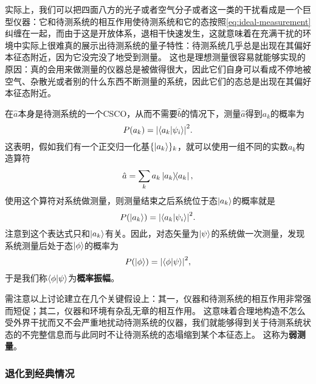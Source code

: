 \documentclass[hyperref, UTF8, a4paper]{ctexart}
\begin{document}

实际上，我们可以把四面八方的光子或者空气分子或者这一类的干扰看成是一个巨型仪器：它和待测系统的相互作用使待测系统和它的态按照\eqref{eq:ideal-measurement}纠缠在一起，而由于这是开放体系，退相干快速发生，这就意味着在充满干扰的环境中实际上很难真的展示出待测系统的量子特性：待测系统几乎总是出现在其偏好本征态附近，因为它没完没了地受到测量。
这也是理想测量很容易就能够实现的原因：真的会用来做测量的仪器总是被做得很大，因此它们自身可以看成不停地被空气、杂散光或者别的什么东西不断测量的系统，因此它们的态总是出现在其偏好本征态附近。

在$\hat{a}$本身是待测系统的一个CSCO，从而不需要$\hat{b}$的情况下，测量$\hat{a}$得到$a_k$的概率为
\begin{equation}
    P(a_k) = \abs{\braket{a_k}{\psi_i}}^2.
\end{equation}
这表明，假如我们有一个正交归一化基$\{\ket{a_k}\}_k$，就可以使用一组不同的实数$a_k$构造算符
\[
    \hat{a} = \sum_k a_k \dyad{a_k},
\]
使用这个算符对系统做测量，则测量结束之后系统位于态$\ket{a_k}$的概率就是
\begin{equation}
    P(\ket{a_k}) = \abs{\braket{a_k}{\psi_i}}^2.
\end{equation}
注意到这个表达式只和$\ket{a_k}$有关。因此，对态矢量为$\ket{\psi}$的系统做一次测量，发现系统测量后处于态$\ket{\phi}$的概率为
\begin{equation}
    P(\ket{\phi}) = \abs{\braket{\phi}{\psi}}^2,
\end{equation}
于是我们称$\braket{\phi}{\psi}$为\textbf{概率振幅}。

需注意以上讨论建立在几个关键假设上：其一，仪器和待测系统的相互作用非常强而短促；其二，仪器和环境有杂乱无章的相互作用。
这意味着合理地构造不怎么受外界干扰而又不会严重地扰动待测系统的仪器，我们就能够得到关于待测系统状态的不完整信息而与此同时不让待测系统的态塌缩到某个本征态上。
这称为\textbf{弱测量}。

\subsubsection{退化到经典情况}\label{sec:back-to-classical}
\end{document}
